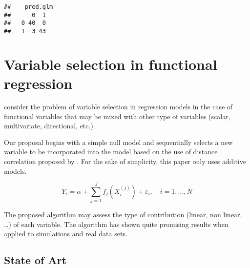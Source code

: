 \documentclass[
]{book}
\begin{document}
\begin{verbatim}
##    pred.glm
##      0  1
##   0 40  0
##   1  3 43
\end{verbatim}

\hypertarget{variable-selection-in-functional-regression}{%
\section{Variable selection in functional regression}\label{variable-selection-in-functional-regression}}

\citet{Febrero-Bande2019} consider the problem of variable selection in regression models in the case of functional variables that may be mixed with other type of variables (scalar, multivariate, directional, etc.).

Our proposal begins with a simple null model and sequentially selects a new variable to be incorporated into the model based on the use of distance correlation proposed by \citep{Szekely2007}. For the sake of simplicity, this paper only uses additive models.

\[
Y_i=\alpha+\sum_{j=1}^Jf_j({X_i^{(j)}})+\varepsilon_i,\quad i=1,\ldots,N
\]

The proposed algorithm may assess the type of contribution (linear, non linear, \ldots) of each variable. The algorithm has shown quite promising results when applied to simulations and real data sets.

\hypertarget{state-of-art-1}{%
\subsection{State of Art}\label{state-of-art-1}}
\end{document}

